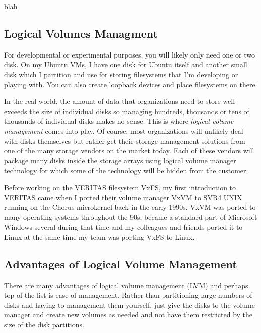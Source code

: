 \noindent
blah 


\subsection{Logical Volumes Managment}

For developmental or experimental purposes, you will likely only need one or two disk. On my Ubuntu VMs, I have one disk for Ubuntu itself and another small disk which I partition and use for storing filesystems that I'm developing or playing with. You can also create loopback devices and place filesystems on there.

In the real world, the amount of data that organizations need to store well exceeds the size of individual disks so managing hundreds, thousands or tens of thousands of individual disks makes no sense. This is where \textit{logical volume management} comes into play. Of course, most organizations will unlikely deal with disks themselves but rather get their storage management solutions from one of the many storage vendors on the market today. Each of these vendors will package many disks inside the storage arrays using logical volume manager technology for which some of the technology will be hidden from the customer.

Before working on the VERITAS filesystem VxFS, my first introduction to VERITAS came when I ported their volume manager VxVM to SVR4 UNIX running on the Chorus microkernel back in the early 1990s. VxVM was ported to many operating systems throughout the 90s, became a standard part of Microsoft Windows several during that time and my colleagues and friends ported it to Linux at the same time my team was porting VxFS to Linux.


\subsection{Advantages of Logical Volume Management}

There are many advantages of logical volume management (LVM) and perhaps top of the list is ease of management. Rather than partitioning large numbers of disks and having to management them yourself, just give the disks to the volume manager and create new volumes as needed and not have them restricted by the size of the disk partitions.

